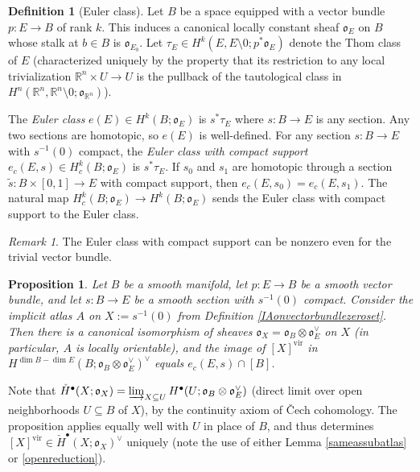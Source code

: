 \documentclass[12pt]{article}
\newtheorem{proposition}[theorem]{Proposition}
\theoremstyle{definition}
\newtheorem{definition}[theorem]{Definition}
\theoremstyle{remark}
\newtheorem{remark}[theorem]{Remark}
\numberwithin{equation}{subsection}
\newcommand{\oo}{\mathfrak o}
\newcommand{\RR}{\mathbb R}
\newcommand{\cH}{\check H}
\newcommand{\vir}{\mathrm{vir}}
\begin{document}
\begin{definition}[Euler class]
Let $B$ be a space equipped with a vector bundle $p:E\to B$ of rank $k$.  This induces a canonical locally constant sheaf $\oo_E$ on $B$ whose stalk at $b\in B$ is $\oo_{E_b}$.  Let $\tau_E\in H^k(E,E\setminus 0;p^\ast\oo_E)$ denote the Thom class of $E$ (characterized uniquely by the property that its restriction to any local trivialization $\RR^n\times U\to U$ is the pullback of the tautological class in $H^n(\RR^n,\RR^n\setminus 0;\oo_{\RR^n})$).

The \emph{Euler class} $e(E)\in H^k(B;\oo_E)$ is $s^\ast\tau_E$ where $s:B\to E$ is any section.  Any two sections are homotopic, so $e(E)$ is well-defined.  For any section $s:B\to E$ with $s^{-1}(0)$ compact, the \emph{Euler class with compact support} $e_c(E,s)\in H^k_c(B;\oo_E)$ is $s^\ast\tau_E$.  If $s_0$ and $s_1$ are homotopic through a section $\tilde s:B\times[0,1]\to E$ with compact support, then $e_c(E,s_0)=e_c(E,s_1)$.  The natural map $H^k_c(B;\oo_E)\to H^k(B;\oo_E)$ sends the Euler class with compact support to the Euler class.
\end{definition}

\begin{remark}
The Euler class with compact support can be nonzero even for the trivial vector bundle.
\end{remark}

\begin{proposition}\label{actuallygiveseulerclass}
Let $B$ be a smooth manifold, let $p:E\to B$ be a smooth vector bundle, and let $s:B\to E$ be a smooth section with $s^{-1}(0)$ compact.  Consider the implicit atlas $A$ on $X:=s^{-1}(0)$ from Definition \ref{IAonvectorbundlezeroset}.  Then there is a canonical isomorphism of sheaves $\oo_X=\oo_B\otimes\oo_E^\vee$ on $X$ (in particular, $A$ is locally orientable), and the image of $[X]^\vir$ in $H^{\dim B-\dim E}(B;\oo_B\otimes\oo_E^\vee)^\vee$ equals $e_c(E,s)\cap[B]$.
\end{proposition}

Note that $\cH^\bullet(X;\oo_X)=\varinjlim_{X\subseteq U}H^\bullet(U;\oo_B\otimes\oo_E^\vee)$ (direct limit over open neighborhoods $U\subseteq B$ of $X$), by the continuity axiom of \v Cech cohomology.  The proposition applies equally well with $U$ in place of $B$, and thus determines $[X]^\vir\in\cH^\bullet(X;\oo_X)^\vee$ uniquely (note the use of either Lemma \ref{sameassubatlas} or \ref{openreduction}).
\end{document}
